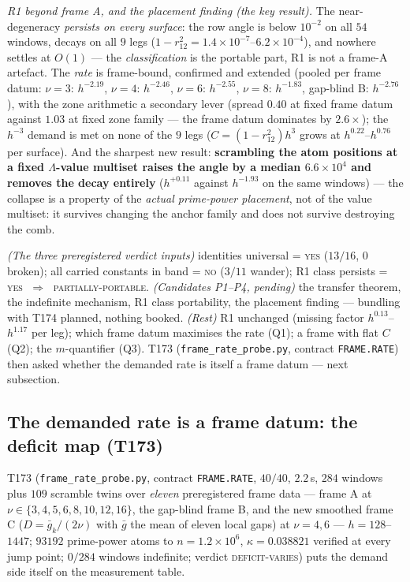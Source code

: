 \documentclass[11pt,a4paper]{article}
\begin{document}
\emph{R1 beyond frame A, and the placement finding (the key result).}
The near-degeneracy \emph{persists on every surface}: the row angle is
below $10^{-2}$ on all $54$ windows, decays on all $9$ legs
($1-r_{12}^2=1.4\times10^{-7}$--$6.2\times10^{-4}$), and nowhere
settles at $O(1)$ --- the \emph{classification} is the portable part,
R1 is not a frame-A artefact. The \emph{rate} is frame-bound, confirmed
and extended (pooled per frame datum: $\nu=3$: $h^{-2.19}$, $\nu=4$:
$h^{-2.46}$, $\nu=6$: $h^{-2.55}$, $\nu=8$: $h^{-1.83}$, gap-blind B:
$h^{-2.76}$), with the zone arithmetic a secondary lever (spread $0.40$
at fixed frame datum against $1.03$ at fixed zone family --- the frame
datum dominates by $2.6\times$); the $h^{-3}$ demand is met on none of
the $9$ legs ($C=(1-r_{12}^2)h^{3}$ grows at $h^{0.22}$--$h^{0.76}$ per
surface). And the sharpest new result: \textbf{scrambling the atom
positions at a fixed $\Lambda$-value multiset raises the angle by a
median $6.6\times10^{4}$ and removes the decay entirely}
($h^{+0.11}$ against $h^{-1.93}$ on the same windows) --- the collapse
is a property of the \emph{actual prime-power placement}, not of the
value multiset: it survives changing the anchor family and does not
survive destroying the comb.

\begin{keybox}
\emph{(The three preregistered verdict inputs)} identities universal =
\textsc{yes} ($13/16$, $0$ broken); all carried constants in band =
\textsc{no} ($3/11$ wander); R1 class persists = \textsc{yes} $\;\Rightarrow\;$
\textsc{partially-portable}. \emph{(Candidates P1--P4, pending)} the
transfer theorem, the indefinite mechanism, R1 class portability, the
placement finding --- bundling with T174 planned, nothing booked.
\emph{(Rest)} R1 unchanged (missing factor $h^{0.13}$--$h^{1.17}$ per
leg); which frame datum maximises the rate (Q1); a frame with flat $C$
(Q2); the $m$-quantifier (Q3). T173 (\texttt{frame\_rate\_probe.py},
contract \texttt{FRAME.RATE}) then asked whether the demanded rate is
itself a frame datum --- next subsection.
\end{keybox}

\subsection{The demanded rate is a frame datum: the deficit map
(T173)}\label{sec:t173}
T173 (\texttt{frame\_rate\_probe.py}, contract \texttt{FRAME.RATE},
$40/40$, $2.2$\,s, $284$ windows plus $109$ scramble twins over
\emph{eleven} preregistered frame data --- frame A at
$\nu\in\{3,4,5,6,8,10,12,16\}$, the gap-blind frame B, and the new
smoothed frame C ($D=\bar g_k/(2\nu)$ with $\bar g$ the mean of eleven
local gaps) at $\nu=4,6$ --- $h=128$--$1447$; $93192$ prime-power atoms
to $n=1.2\times10^{6}$, $\kappa=0.038821$ verified at every jump point;
$0/284$ windows indefinite; verdict \textsc{deficit-varies}) puts the
demand side itself on the measurement table.
\end{document}
